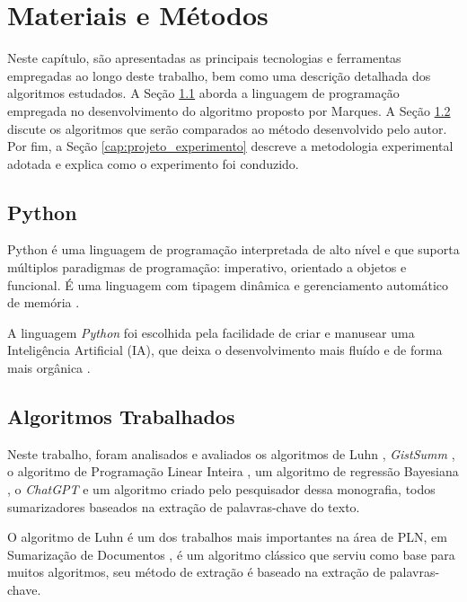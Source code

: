 \chapter{Materiais e Métodos}
\label{chap:materiais-e-metodos}

Neste capítulo, são apresentadas as principais tecnologias e ferramentas empregadas ao longo deste 
trabalho, bem como uma descrição detalhada dos algoritmos estudados. A Seção \ref{sec:python} aborda a 
linguagem de programação empregada no desenvolvimento do algoritmo proposto por Marques. A Seção 
\ref{chap:algoritmos-trabalhados} discute os algoritmos que serão comparados ao método desenvolvido pelo 
autor. Por fim, a Seção \ref{cap:projeto_experimento} descreve a metodologia experimental adotada e explica 
como o experimento foi conduzido.

\section{Python}
\label{sec:python}
Python é uma linguagem de programação interpretada de alto nível e que suporta múltiplos paradigmas de 
programação: imperativo, orientado a objetos e funcional. É uma linguagem com tipagem dinâmica e 
gerenciamento automático de memória \cite{pereira2020sistema}.

A linguagem \textit{Python} foi escolhida pela facilidade de criar e manusear uma Inteligência Artificial (IA), que deixa o desenvolvimento mais fluído e de forma mais orgânica \cite{deolhar}.

\section{Algoritmos Trabalhados}
\label{chap:algoritmos-trabalhados}

Neste trabalho, foram analisados e avaliados os algoritmos de Luhn \cite{luhn1957stoical}, \textit{GistSumm} \cite{gistsumm}, o algoritmo de Programação Linear Inteira \cite{oliveira2018sumarizaccao}, um algoritmo de regressão Bayesiana \cite{sodre2019avaliando}, o \textit{ChatGPT} \cite{rudolph2023chatgpt} e um algoritmo criado pelo pesquisador dessa monografia, todos sumarizadores baseados na extração de palavras-chave do texto. 

O algoritmo de Luhn é um dos trabalhos mais importantes na área de PLN, em Sumarização de Documentos \cite{luhn1957stoical}, é um algoritmo clássico que serviu como base para muitos algoritmos, seu método de extração é baseado na extração de palavras-chave.

